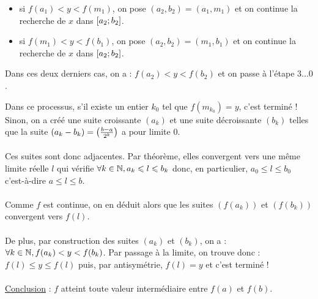 \begin{dem}
\begin{itemize}
\begin{itemize}
            \item si \(f (a_1) < y < f (m_1)\), on pose \((a_2, b_2) = (a_1, m_1)\) et on continue la recherche de \(x\) dans \(\left[a_2;b_2\right] \).
            \item si \(f (m_1) < y < f (b_1)\), on pose \((a_2, b_2) = (m_1, b_1)\) et on continue la recherche de \(x\) dans \(\left[a_2;b_2\right] \).
        \end{itemize}
        Dans ces deux derniers cas, on a : \(f (a_2) < y < f (b_2)\) et on passe à l’étape \(3...0\).
\end{itemize}
Dans ce processus, s’il existe un entier \(k_0\) tel que \(f (m_{k_0} ) = y\), c’est terminé ! Sinon, on a créé une suite croissante \((a_k)\) et une suite décroissante \((b_k)\) telles que la suite \(\left(a_k-b_k\right) = \left(\frac{b-a}{2^k}\right)\) a pour limite \(0\).\\~\\
Ces suites sont donc adjacentes. Par théorème, elles convergent vers une même limite réelle \(l\) qui vérifie \(\forall k \in \mathbb{N}, a_k \leqslant l \leqslant b_k\) donc, en particulier, \(a_0 \leq l \leq b_0 \) c’est-à-dire \(a \leq l \leq b\).\\~\\
Comme \(f\) est continue, on en déduit alors que les suites \((f (a_k))\) et \((f (b_k))\) convergent vers \(f (l)\).\\~\\
De plus, par construction des suites \((a_k)\) et \((b_k)\), on a : \(\forall k \in  \mathbb{N}, f (a_k) < y < f (b_k)\). Par passage à la limite, on trouve donc : \(f (l) \leq y \leq f (l)\) puis, par antisymétrie, \(f (l) = y\) et c’est terminé !\\~\\
\underline{Conclusion} : \(f\) atteint toute valeur intermédiaire entre \(f (a)\) et \(f (b)\).
\end{dem}


